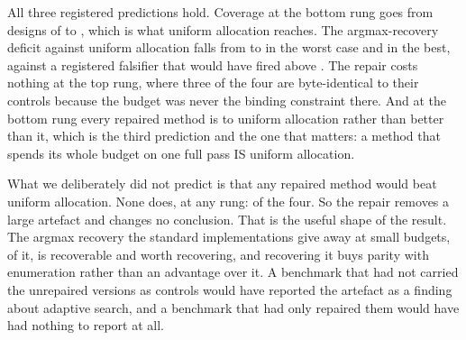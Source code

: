 \documentclass[11pt]{article}
\begin{document}
All three registered predictions hold. Coverage at the bottom rung goes from \WmUcbPooledWarmLowTouchWas{}
designs of \WmDesigns{} to \WmUcbPooledWarmLowTouch{}, which is what uniform allocation reaches. The
argmax-recovery deficit against uniform allocation falls from \WmUcbPooledWarmLowDeficitWas{} to
\WmWorstDeficit{} in the worst case and \WmBestDeficit{} in the best, against a registered falsifier
that would have fired above \WmDeficitMax{}. The repair costs nothing at the top rung, where three of the four
are byte-identical to their controls because the budget was never the binding constraint there. And
at the bottom rung every repaired method is \WmUcbPooledWarmLowVsUni{} to uniform allocation rather
than better than it, which is the third prediction and the one that matters: a method that spends
its whole budget on one full pass IS uniform allocation.

What we deliberately did not predict is that any repaired method would beat uniform allocation. None
does, at any rung: \WmBeatUni{} of the four. So the repair removes a large artefact and changes no
conclusion. That is the useful shape of the result. The
argmax recovery the standard implementations give away at small budgets,
\WmUcbPooledWarmLowDeficitWas{} of it, is recoverable and worth recovering, and recovering it buys parity with enumeration rather
than an advantage over it. A benchmark that had not carried the
unrepaired versions as controls would have reported the artefact as a finding about adaptive search,
and a benchmark that had only repaired them would have had nothing to report at all.
\end{document}
